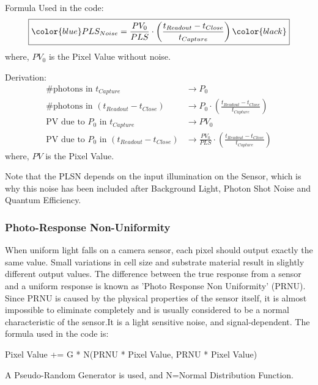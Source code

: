 \documentclass[../../main.tex]{subfiles}
\begin{document}
Formula Used in the code:
\begin{equation}
    \begin{aligned}
        \boxed{ \color{blue} PLS_{Noise} =  \frac{PV_0}{PLS} \cdot \left(\frac{t_{Readout} - t_{Close}}{t_{Capture}}\right) \color{black}} 
    \end{aligned}
\end{equation}
where, $PV_0$ is the Pixel Value without noise. 

Derivation:
\begin{equation*}
    \begin{aligned}
        \text{\# photons in } t_{Capture} & \rightarrow P_0 \\
        \text{\# photons in } (t_{Readout} - t_{Close}) & \rightarrow P_0 \cdot \left(\frac{t_{Readout} - t_{Close}}{t_{Capture}}\right) \\
        \text{PV due to } P_0 \text{ in } t_{Capture} & \rightarrow PV_0 \\
        \text{PV due to } P_0 \text{ in } (t_{Readout} - t_{Close}) & \rightarrow \frac{PV_0}{PLS} \cdot \left(\frac{t_{Readout} - t_{Close}}{t_{Capture}}\right)
    \end{aligned}
\end{equation*}
where, $PV$ is the Pixel Value. 

Note that the PLSN depends on the input illumination on the Sensor, which is why this noise has been included after Background Light, Photon Shot Noise and Quantum Efficiency.



\subsubsection{Photo-Response Non-Uniformity} %
When uniform light falls on a camera sensor, each pixel should output exactly the same value. Small variations in cell size and substrate material result in slightly different output values. The difference between the true response from a sensor and a uniform response is known as 'Photo Response Non Uniformity' (PRNU).
Since PRNU is caused by the physical properties of the sensor itself, it is almost impossible to eliminate completely and is usually considered to be a normal characteristic of the sensor.It is a light sensitive noise, and signal-dependent.
The formula used in the code is:


Pixel Value += G * N(PRNU * Pixel Value, PRNU * Pixel Value)

A Pseudo-Random Generator is used, and N=Normal Distribution Function.
\end{document}
